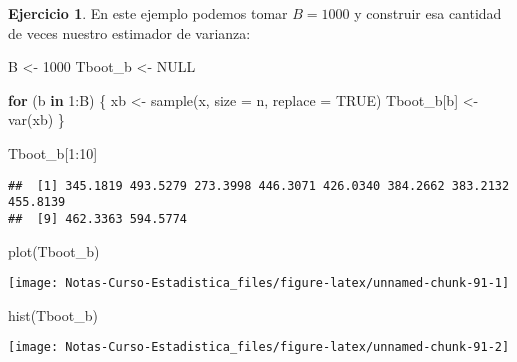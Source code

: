 \documentclass[
  12pt,
]{book}
\newenvironment{Shaded}{\begin{snugshade}}{\end{snugshade}}
\newcommand{\AttributeTok}[1]{\textcolor[rgb]{0.77,0.63,0.00}{#1}}
\newcommand{\ConstantTok}[1]{\textcolor[rgb]{0.00,0.00,0.00}{#1}}
\newcommand{\ControlFlowTok}[1]{\textcolor[rgb]{0.13,0.29,0.53}{\textbf{#1}}}
\newcommand{\DecValTok}[1]{\textcolor[rgb]{0.00,0.00,0.81}{#1}}
\newcommand{\FunctionTok}[1]{\textcolor[rgb]{0.00,0.00,0.00}{#1}}
\newcommand{\NormalTok}[1]{#1}
\newcommand{\OtherTok}[1]{\textcolor[rgb]{0.56,0.35,0.01}{#1}}
\newcommand{\SpecialCharTok}[1]{\textcolor[rgb]{0.00,0.00,0.00}{#1}}
\theoremstyle{definition}
\theoremstyle{definition}
\theoremstyle{definition}
\newtheorem{exercise}{Ejercicio}[chapter]
\theoremstyle{definition}
\theoremstyle{remark}
\begin{document}
\begin{exercise}
\protect\hypertarget{exr:unnamed-chunk-89}{}\label{exr:unnamed-chunk-89}En este ejemplo podemos tomar \(B=1000\) y construir esa cantidad de veces nuestro estimador de varianza:
\end{exercise}

\begin{Shaded}
\begin{Highlighting}[]
\NormalTok{B }\OtherTok{\textless{}{-}} \DecValTok{1000}
\NormalTok{Tboot\_b }\OtherTok{\textless{}{-}} \ConstantTok{NULL}

\ControlFlowTok{for}\NormalTok{ (b }\ControlFlowTok{in} \DecValTok{1}\SpecialCharTok{:}\NormalTok{B) \{}
\NormalTok{    xb }\OtherTok{\textless{}{-}} \FunctionTok{sample}\NormalTok{(x, }\AttributeTok{size =}\NormalTok{ n, }\AttributeTok{replace =} \ConstantTok{TRUE}\NormalTok{)}
\NormalTok{    Tboot\_b[b] }\OtherTok{\textless{}{-}} \FunctionTok{var}\NormalTok{(xb)}
\NormalTok{\}}

\NormalTok{Tboot\_b[}\DecValTok{1}\SpecialCharTok{:}\DecValTok{10}\NormalTok{]}
\end{Highlighting}
\end{Shaded}

\begin{verbatim}
##  [1] 345.1819 493.5279 273.3998 446.3071 426.0340 384.2662 383.2132 455.8139
##  [9] 462.3363 594.5774
\end{verbatim}

\begin{Shaded}
\begin{Highlighting}[]
\FunctionTok{plot}\NormalTok{(Tboot\_b)}
\end{Highlighting}
\end{Shaded}

\begin{center}\texttt{[image: Notas-Curso-Estadistica\_files/figure-latex/unnamed-chunk-91-1]} \end{center}

\begin{Shaded}
\begin{Highlighting}[]
\FunctionTok{hist}\NormalTok{(Tboot\_b)}
\end{Highlighting}
\end{Shaded}

\begin{center}\texttt{[image: Notas-Curso-Estadistica\_files/figure-latex/unnamed-chunk-91-2]} \end{center}
\end{document}
